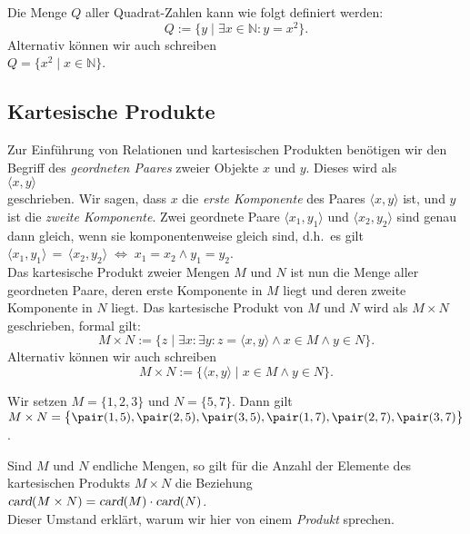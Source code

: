\example
Die Menge $Q$ aller Quadrat-Zahlen kann wie folgt definiert werden: 
\[ Q := \{ y \mid \exists x \in \mathbb{N}: y = x^2\}. \]
Alternativ k\"{o}nnen wir auch schreiben
\\[0.2cm]
\hspace*{1.3cm}
$Q = \bigl\{ x^2 \mid x \in \mathbb{N} \bigr\}$. 
\eox

\subsection{Kartesische Produkte}
Zur Einf\"{u}hrung von Relationen und kartesischen Produkten ben\"{o}tigen wir den Begriff
des \emph{geordneten Paares} zweier Objekte $x$ und $y$.  Dieses wird  als \\[0.2cm]
\hspace*{1.3cm} $\langle x, y \rangle$ \\[0.2cm]
geschrieben.  Wir sagen, dass $x$ die \emph{erste Komponente} des Paares $\langle x, y \rangle$ ist, 
und $y$ ist die \emph{zweite Komponente}.  Zwei geordnete Paare $\langle x_1, y_1 \rangle$ und $\langle x_2, y_2 \rangle$
sind genau dann gleich, wenn sie komponentenweise gleich sind, d.h.~es gilt \\[0.2cm]
\hspace*{1.3cm} $\langle x_1, y_1 \rangle \,=\,\langle x_2, y_2 \rangle  \;\Leftrightarrow\; x_1 = x_2 \wedge y_1 = y_2$. \\[0.2cm]
Das kartesische Produkt zweier Mengen $M$ und $N$ ist nun die Menge aller geordneten
Paare, deren erste Komponente in $M$ liegt und deren zweite Komponente in $N$ liegt.
Das kartesische Produkt von $M$ und $N$ wird als $M \times N$ geschrieben, formal gilt: 
\[ M \times N := \big\{ z \mid \exists x\colon \exists y\colon z = \langle x,y\rangle \wedge x\in M \wedge y \in N \}. \]
Alternativ k\"{o}nnen wir auch schreiben
\[ M \times N := \big\{ \langle x,y\rangle \mid  x\in M \wedge y \in N \}. \]

\example
 Wir setzen $M = \{ 1, 2, 3 \}$ und $N = \{ 5, 7 \}$. Dann gilt\\[0.2cm]
\hspace*{1.3cm} 
$M \times N = \bigl\{ \pair(1,5),\pair(2,5),\pair(3,5),\pair(1,7),\pair(2,7),\pair(3,7)\bigr\}$.
\eox

\remark
Sind $M$ und $N$ endliche Mengen, so gilt f\"{u}r die Anzahl der Elemente des kartesischen
Produkts $M \times N$ die Beziehung
\\[0.2cm]
\hspace*{1.3cm}
$\textsl{card}(M \times N) = \textsl{card}(M) \cdot \textsl{card}(N)$.
\\[0.2cm]
Dieser Umstand erkl\"{a}rt, warum wir hier von einem \emph{Produkt} sprechen.  \eox

